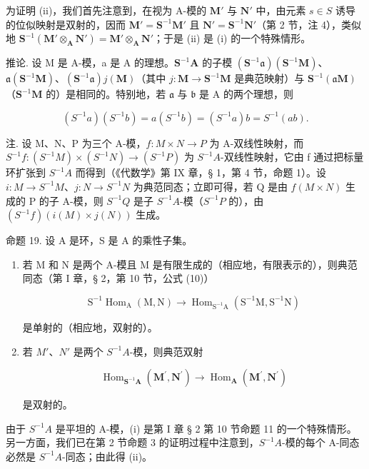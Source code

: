 为证明 (ii)，我们首先注意到，在视为 A-模的 \(\mathbf{M}'\) 与 \(\mathbf{N}'\) 中，由元素 \(s \in S\) 诱导的位似映射是双射的，因而 \(\mathbf{M}' = \mathbf{S}^{-1}\mathbf{M}'\) 且 \(\mathbf{N}' = \mathbf{S}^{-1}\mathbf{N}'\)（第 2 节，注 4），类似地 \(\mathbf{S}^{-1}(\mathbf{M}' \otimes_{\mathbf{A}} \mathbf{N}') = \mathbf{M}' \otimes_{\mathbf{A}} \mathbf{N}'\)；于是 (ii) 是 (i) 的一个特殊情形。

推论. 设 M 是 A-模，a 是 A 的理想。\(\mathbf{S}^{-1}\mathbf{A}\) 的子模 \((\mathbf{S}^{-1}\mathfrak{a})(\mathbf{S}^{-1}\mathbf{M})\)、\(\mathfrak{a}(\mathbf{S}^{-1}\mathbf{M})\)、\((\mathbf{S}^{-1}\mathfrak{a})j(\mathbf{M})\)（其中 \(j: \mathbf{M} \to \mathbf{S}^{-1}\mathbf{M}\) 是典范映射）与 \(\mathbf{S}^{-1}(\mathfrak{a}\mathbf{M})\)（\(\mathbf{S}^{-1}\mathbf{M}\) 的）是相同的。特别地，若 \(\mathfrak{a}\) 与 \(\mathfrak{b}\) 是 A 的两个理想，则

\[
(S ^ {- 1} a) (S ^ {- 1} b) = a (S ^ {- 1} b) = (S ^ {- 1} a) b = S ^ {- 1} (a b).
\]

注. 设 M、N、P 为三个 A-模，\(f: M \times N \to P\) 为 A-双线性映射，而 \(S^{-1}f: (S^{-1}M) \times (S^{-1}N) \to (S^{-1}P)\) 为 \(S^{-1}A\)-双线性映射，它由 f 通过把标量环扩张到 \(S^{-1}A\) 而得到（《代数学》第 IX 章，§ 1，第 4 节，命题 1）。设 \(i: M \to S^{-1}M\)、\(j: N \to S^{-1}N\) 为典范同态；立即可得，若 Q 是由 \(f(M \times N)\) 生成的 P 的子 A-模，则 \(S^{-1}Q\) 是子 \(S^{-1}A\)-模（\(S^{-1}P\) 的），由 \((S^{-1}f)(i(M) \times j(N))\) 生成。

命题 19. 设 A 是环，S 是 A 的乘性子集。

\begin{enumerate}
\def\labelenumi{(\roman{enumi})}
\tightlist
\item
  若 M 和 N 是两个 A-模且 M 是有限生成的（相应地，有限表示的），则典范同态（第 I 章，§ 2，第 10 节，公式 (10)）

\[
\mathrm{S} ^ {- 1} \operatorname{Hom} _ {\mathrm{A}} (\mathrm{M}, \mathrm{N}) \rightarrow \operatorname{Hom} _ {\mathrm{S} ^ {- 1} \mathrm{A}} (\mathrm{S} ^ {- 1} \mathrm{M}, \mathrm{S} ^ {- 1} \mathrm{N})
\]

是单射的（相应地，双射的）。

\item
  若 \(M'\)、\(N'\) 是两个 \(S^{-1}A\)-模，则典范双射

\[
\operatorname{Hom} _ {\mathbf {S} ^ {- 1} \mathbf {A}} (\mathbf {M} ^ {\prime}, \mathbf {N} ^ {\prime}) \rightarrow \operatorname{Hom} _ {\mathbf {A}} (\mathbf {M} ^ {\prime}, \mathbf {N} ^ {\prime})
\]

是双射的。

\end{enumerate}
由于 \(S^{-1}A\) 是平坦的 A-模，(i) 是第 I 章 § 2 第 10 节命题 11 的一个特殊情形。另一方面，我们已在第 2 节命题 3 的证明过程中注意到，\(S^{-1}A\)-模的每个 A-同态必然是 \(S^{-1}A\)-同态；由此得 (ii)。

